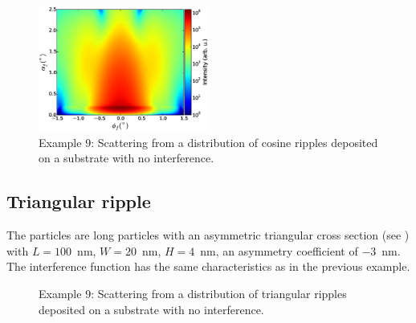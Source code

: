 \begin{figure}[H]
\begin{center}
\includegraphics[width=0.5\textwidth]{Figures/py-ex/figure_ex009CosRippleNoInterf.eps}
\end{center}
\caption{Example 9: Scattering from a distribution of cosine ripples deposited on a substrate with no interference.}
\label{fig:PythonEx9CosRipplenointerf}
\end{figure}

\subsection{Triangular ripple}
 The particles are long particles with an asymmetric triangular cross section (see ) with  $L=100$~nm, $W=20$~nm, $H=4$~nm, an asymmetry coefficient of $-3$~nm. The interference function has the same characteristics as in the previous example.

\begin{figure}[H]
\hfill
{}
\hfill
{}
\hfill
\caption{Example 9: Scattering from a distribution of triangular ripples deposited on a substrate with no interference.}
\label{fig:PythonEx9TriangRipple}
\end{figure}

